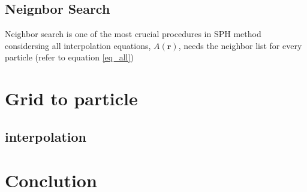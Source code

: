     \subsection{Neignbor Search}
    Neighbor search is one of the most crucial procedures in SPH method considersing all interpolation equations, $A(\textbf{r})$, needs the neighbor list for every particle (refer to equation \eqref{eq_all})


\section{Grid to particle}
    \subsection{interpolation}

\section{Conclution}